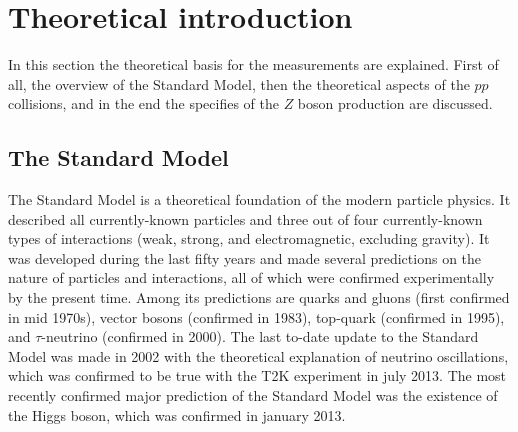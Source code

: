 \chapter{Theoretical introduction}
\label{sec:Theory}

In this section the theoretical basis for the measurements are explained. First of all, the overview of the Standard Model, then the theoretical aspects of the $pp$ collisions, and in the end the specifies of the $Z$ boson production are discussed.

\section{The Standard Model}
\label{sec:theory_SM}

The Standard Model is a theoretical foundation of the modern particle physics. It described all currently-known particles and three out of four currently-known types of interactions (weak, strong, and electromagnetic, excluding gravity). It was developed during the last fifty years and made several predictions on the nature of particles and interactions, all of which were confirmed experimentally by the present time. Among its predictions are quarks and gluons (first confirmed in mid 1970s), vector bosons (confirmed in 1983), top-quark (confirmed in 1995), and $\tau$-neutrino (confirmed in 2000). The last to-date update to the Standard Model was made in 2002 with the theoretical explanation of neutrino oscillations, which was confirmed to be true with the T2K experiment in july 2013. The most recently confirmed major prediction of the Standard Model was the existence of the Higgs boson, which was confirmed in january 2013.

